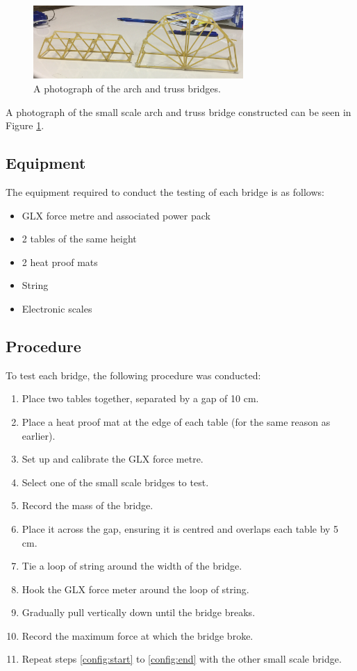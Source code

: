 \documentclass[a4paper,11pt]{article}
\begin{document}
\begin{figure}
\begin{center}
\includegraphics[width=8cm]{figures/config-photo.png}
\end{center}
\caption{A photograph of the arch and truss bridges.}
\label{config:photo}
\end{figure}

A photograph of the small scale arch and truss bridge constructed can be seen
in Figure
\ref{config:photo}.


\subsection{Equipment}

The equipment required to conduct the testing of each bridge is as follows:

\begin{itemize}
\item GLX force metre and associated power pack
\item 2 tables of the same height
\item 2 heat proof mats
\item String
\item Electronic scales
\end{itemize}


\subsection{Procedure}

To test each bridge, the following procedure was conducted:

\begin{enumerate}
\item Place two tables together, separated by a gap of 10 cm.
\item Place a heat proof mat at the edge of each table (for the same reason as
	earlier).
\item Set up and calibrate the GLX force metre.
\item \label{config:start} Select one of the small scale bridges to test.
\item Record the mass of the bridge.
\item Place it across the gap, ensuring it is centred and overlaps each table
	by 5 cm.
\item Tie a loop of string around the width of the bridge.
\item Hook the GLX force meter around the loop of string.
\item Gradually pull vertically down until the bridge breaks.
\item \label{config:end} Record the maximum force at which the bridge broke.
\item Repeat steps \ref{config:start} to \ref{config:end} with the other small
	scale bridge.
\end{enumerate}
\end{document}
